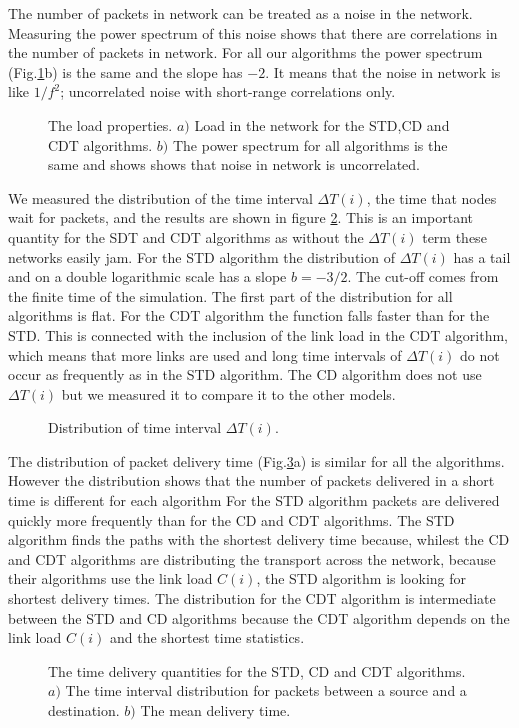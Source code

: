 \documentclass[runningheads]{llncs}
\begin{document}
The number of packets in network can be treated as a noise in the
network. Measuring the power spectrum of this noise shows that there
are correlations in the number of packets in network. For all our
algorithms the power spectrum (Fig.\ref{LoadProp}b) is the same and
the slope has $-2$.  It means that the noise in network is like
$1/f^2$; uncorrelated noise with short-range correlations only.
\begin{figure}
\centerline{} \caption{The load
properties. $a)$ Load in the network for the STD,CD and CDT
algorithms. $b)$ The power spectrum for all algorithms is the same and shows
shows that noise in network is uncorrelated.} \label{LoadProp}
\end{figure}
We measured the distribution of the time interval $\Delta T(i)$, the
time that nodes wait for packets, and the results are shown in
figure \ref{TIDdt}. This is an important quantity for the SDT and
CDT algorithms as without the $\Delta T(i)$ term these networks
easily jam. For the STD algorithm the distribution of $\Delta T(i)$
has a tail and on a double logarithmic scale has a slope $b=-3/2$.
The cut-off comes from the finite time of the simulation. The first
part of the distribution for all algorithms is flat. For the CDT
algorithm the function falls faster than for the STD. This is
connected with the inclusion of the link load in the CDT algorithm,
which means that more links are used and long time intervals of
$\Delta T(i)$ do not occur as frequently as in the STD algorithm.
The CD algorithm does not use $\Delta T(i)$ but we measured it to
compare it to the other models.

\begin{figure}[htb]
 \centering
 \centerline{}
  \caption[TIDdt]{Distribution of time interval $\Delta T(i)$.}
  \label{TIDdt}
\end{figure}

The distribution of packet delivery time (Fig.\ref{TimeProp}a) is
similar for all the algorithms. However the distribution shows that
the number of packets delivered in a short time is different for
each algorithm For the STD algorithm packets are delivered quickly
more frequently than for the CD and CDT algorithms. The STD
algorithm finds the paths with the shortest delivery time because,
whilest the CD and CDT algorithms are distributing the transport
across the network, because their algorithms use the link load
$C(i)$, the STD algorithm is looking for shortest delivery times.
The distribution for the CDT algorithm is intermediate between the
STD and CD algorithms because the CDT algorithm depends on the link
load $C(i)$ and the shortest time statistics.
\begin{figure}
\centerline{} \caption{The time
delivery quantities for the STD, CD and CDT algorithms. $a)$ The
time interval distribution for packets between a source and a
destination. $b)$ The mean delivery time.} \label{TimeProp}
\end{figure}
\end{document}
